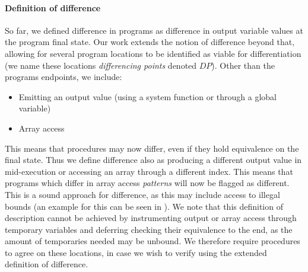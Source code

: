 \paragraph{Definition of difference}
So far, we defined difference in programs as difference in output variable values at the program final state. Our work extends the notion of difference beyond that, allowing for several program locations to be identified as viable for differentiation (we name these locations \emph{differencing points} denoted $DP$). Other than the programs endpoints, we include:
\begin{itemize}
\item Emitting an output value (using a system function or through a global variable)
\item Array access
\end{itemize}
This means that procedures may now differ, even if they hold equivalence on the final state. Thus we define difference also as producing a different output value in mid-execution or accessing an array through a different index. This means that programs which differ in array access \emph{patterns} will now be flagged as different. This is a sound approach for difference, as this may include access to illegal bounds (an example for this can be seen in ). We note that this definition of description cannot be achieved by instrumenting output or array access through temporary variables and deferring checking their equivalence to the end, as the amount of temporaries needed may be unbound. We therefore require procedures to agree on these locations, in case we wish to verify using the extended definition of difference.


